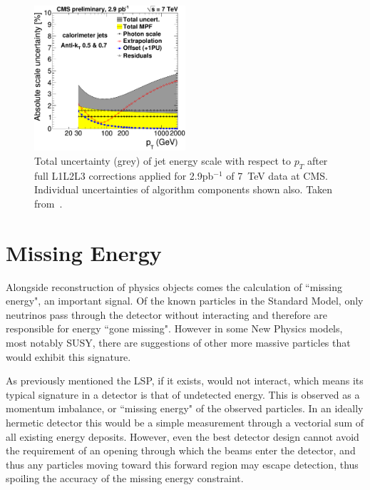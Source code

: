 \begin{figure}
\centering
\includegraphics[width=0.5\textwidth]{Figures/Objects/JESU}
\caption[Total uncertainty (grey) of jet energy scale with respect to $p_{T}$ after full L1L2L3 corrections applied for 2.9\,pb$^{-1}$ of 7~TeV data at CMS. ]{\label{fig:JESU}Total uncertainty (grey) of jet energy scale with respect to $p_{T}$ after full L1L2L3 corrections applied for 2.9pb$^{-1}$ of 7~TeV data at CMS. Individual uncertainties of algorithm components shown also. Taken from~\cite{JME-10-010}.}
\end{figure}

\section{Missing Energy}

Alongside reconstruction of physics objects comes the calculation of ``missing energy", an important signal. Of the known particles in the Standard Model,  only neutrinos pass through the detector without interacting and therefore are responsible for energy ``gone missing". However in some New Physics models, most notably SUSY, there are suggestions of other more massive particles that would exhibit this signature. 
 
As previously mentioned the LSP, if it exists, would not interact, which means its typical signature in a detector is that of undetected energy. This is observed as a momentum imbalance, or ``missing energy" of the observed particles. In an ideally hermetic detector this would be a simple measurement through a vectorial sum of all existing energy deposits. However, even the best detector design cannot avoid the requirement of an opening through which the beams enter the detector, and thus any particles moving toward this forward region may escape detection, thus spoiling the accuracy of the missing energy constraint. 

